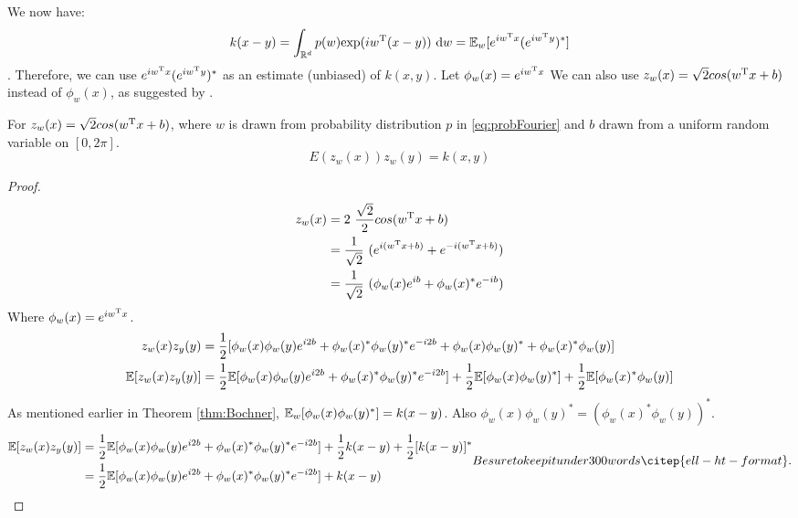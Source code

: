 \documentclass[twoside]{memoir}
\begin{document}
We now have:
\[ k(x - y) = \int_{\mathbb{R}^d} p(w) \text{exp}(iw^{\text{T}}(x - y)) ~ \text{d}w = \mathbb{E}_w[e^{iw^{\text{T}}x}(e^{iw^{\text{T}}y})^*] \].
Therefore, we can use $e^{iw^{\text{T}}x}(e^{iw^{\text{T}}y})^*$ as an estimate (unbiased) of $k(x, y)$.
Let $\phi_w(x) = e^{iw^{\text{T}}x}$
We can also use $z_w(x) = \sqrt{2}cos(w^{\text{T}}x + b)$ instead of $\phi_w(x)$, as suggested by \cite{RFF_Rahimi}.
\begin{prop}
	For $z_w(x) = \sqrt{2}cos(w^{\text{T}}x + b)$, where $w$ is drawn from probability distribution $p$ in \eqref{eq:probFourier} and $b$ drawn from a uniform random variable on $[0, 2\pi]$.
	\[E(z_w(x))z_w(y) = k(x,y)\]
\end{prop}
\begin{proof}
	\begin{equation*}
	\begin{split}
	z_w(x) &= 2 ~ \frac{\sqrt{2}}{2}cos(w^{\text{T}}x + b) \\
	&= \frac{1}{\sqrt{2}}~(e^{i(w^{\text{T}}x+b)} + e^{-i(w^{\text{T}}x+b)}) \\
	&= \frac{1}{\sqrt{2}}~(\phi_w(x)e^{ib} + \phi_w(x)^* e^{-ib})
	\end{split}
	\end{equation*}
	Where $\phi_w(x) = e^{iw^{\text{T}}x}$.
	\begin{equation*}
	\begin{split}
	z_w(x)z_y(y) &= \frac{1}{2}[\phi_w(x)\phi_w(y)e^{i2b} + \phi_w(x)^*\phi_w(y)^*e^{-i2b}
	+ \phi_w(x)\phi_w(y)^* + \phi_w(x)^*\phi_w(y)] \\
	\mathbb{E}[z_w(x)z_y(y)] &= \frac{1}{2}\mathbb{E}[\phi_w(x)\phi_w(y)e^{i2b} + \phi_w(x)^*\phi_w(y)^*e^{-i2b}]
	+ \frac{1}{2}\mathbb{E}[\phi_w(x)\phi_w(y)^*] + \frac{1}{2}\mathbb{E}[\phi_w(x)^*\phi_w(y)] \\ 
	\end{split}
	\end{equation*}
	As mentioned earlier in Theorem \ref{thm:Bochner}, $\mathbb{E}_w[\phi_w(x)\phi_w(y)^*] = k(x - y)$.
	Also $\phi_w(x)\phi_w(y)^* = (\phi_w(x)^*\phi_w(y))^*$.
	\begin{equation*}
	\begin{split}
	\EE[z_w(x)z_y(y)] &= \frac{1}{2}\EE[\phi_w(x)\phi_w(y)e^{i2b} + \phi_w(x)^*\phi_w(y)^*e^{-i2b}]
	+ \frac{1}{2}k(x-y) + \frac{1}{2}[k(x-y)]^* \\
	&= \frac{1}{2}\EE[\phi_w(x)\phi_w(y)e^{i2b} + \phi_w(x)^*\phi_w(y)^*e^{-i2b}] + k(x-y)
	\end{split}Be sure to keep it under 300 words \citep{ell-ht-format}.
	\end{equation*}

\end{proof}
\end{document}
